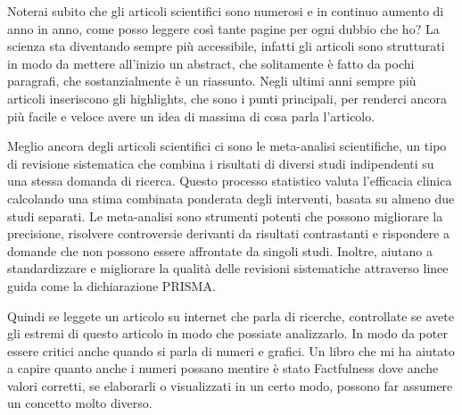 \documentclass[12pt]{book} %
\begin{document}
\bigskip

Noterai subito che gli articoli scientifici sono numerosi e in continuo aumento di anno in anno, come posso leggere così
tante pagine per ogni dubbio che ho? La scienza sta diventando sempre più accessibile, infatti gli articoli sono
strutturati in modo da mettere all'inizio un abstract, che solitamente è fatto da pochi paragrafi,
che sostanzialmente è un riassunto. Negli ultimi anni sempre più articoli inseriscono gli highlights, che sono i punti
principali, per renderci ancora più facile e veloce avere un idea di massima di cosa parla
l'articolo.


\bigskip

Meglio ancora degli articoli scientifici ci sono le meta-analisi scientifiche, un tipo di revisione sistematica che
combina i risultati di diversi studi indipendenti su una stessa domanda di ricerca. Questo processo statistico valuta
l'efficacia clinica calcolando una stima combinata ponderata degli interventi, basata su almeno
due studi separati. Le meta-analisi sono strumenti potenti che possono migliorare la precisione, risolvere controversie
derivanti da risultati contrastanti e rispondere a domande che non possono essere affrontate da singoli studi. Inoltre,
aiutano a standardizzare e migliorare la qualità delle revisioni sistematiche attraverso linee guida come la
dichiarazione PRISMA.

Quindi se leggete un articolo su internet che parla di ricerche, controllate se avete gli estremi di questo articolo in
modo che possiate analizzarlo. In modo da poter essere critici anche quando si parla di numeri e grafici. Un libro che
mi ha aiutato a capire quanto anche i numeri possano mentire è stato
Factfulness dove anche
valori corretti, se elaborarli o visualizzati in un certo modo, possono far assumere un concetto molto diverso.
\end{document}
